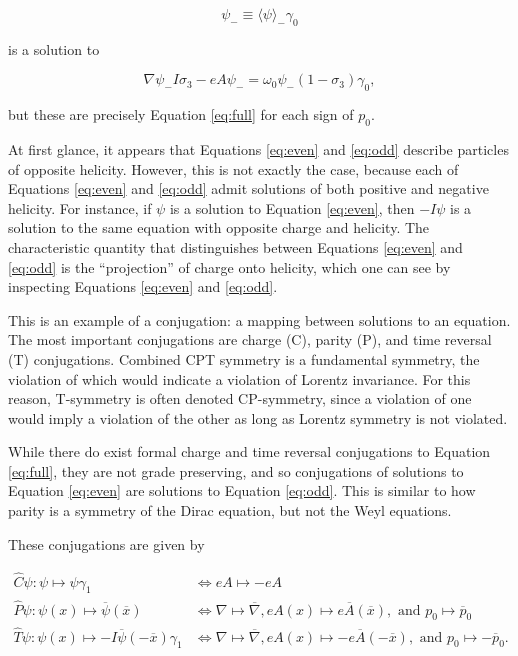 \documentclass{article}
\begin{document}
  \begin{equation}
    \psi_- \equiv \langle \psi \rangle_- \gamma_0\label{eq:0decomposition}
  \end{equation} 

  is a solution to

  \begin{equation}
    \nabla \psi_- I \sigma_3 - e A \psi_- = \omega_0 \psi_- (1 - \sigma_3) \gamma_0,\label{eq:odd}
  \end{equation}

  but these are precisely Equation \ref{eq:full} for each sign of $p_0$.

  At first glance, it appears that Equations \ref{eq:even} and \ref{eq:odd} describe particles of opposite helicity. However, this is not exactly the case, because each of Equations \ref{eq:even} and \ref{eq:odd} admit solutions of both positive and negative helicity. For instance, if $\psi$ is a solution to Equation \ref{eq:even}, then $-I \psi$ is a solution to the same equation with opposite charge and helicity. The characteristic quantity that distinguishes between Equations \ref{eq:even} and \ref{eq:odd} is the ``projection'' of charge onto helicity, which one can see by inspecting Equations \ref{eq:even} and \ref{eq:odd}.

  This is an example of a conjugation: a mapping between solutions to an equation. The most important conjugations are charge (C), parity (P), and time reversal (T) conjugations. Combined CPT symmetry is a fundamental symmetry, the violation of which would indicate a violation of Lorentz invariance. For this reason, T-symmetry is often denoted CP-symmetry, since a violation of one would imply a violation of the other as long as Lorentz symmetry is not violated.

  While there do exist formal charge and time reversal conjugations to Equation \ref{eq:full}, they are not grade preserving, and so conjugations of solutions to Equation \ref{eq:even} are solutions to Equation \ref{eq:odd}. This is similar to how parity is a symmetry of the Dirac equation, but not the Weyl equations.

  These conjugations are given by

  \begin{align}
    \hat C \psi : \psi \mapsto \psi \gamma_1 &\iff eA \mapsto - eA \label{eq:charge}\\
    \hat P \psi : \psi(x) \mapsto \overline \psi(\overline x) &\iff \nabla \mapsto \overline \nabla, eA(x) \mapsto e\overline A(\overline x), \text{ and } p_0 \mapsto \overline p_0 \label{eq:parity}\\
    \hat T \psi : \psi(x) \mapsto -I \overline \psi(-\overline x) \gamma_1 &\iff \nabla \mapsto \overline\nabla, eA(x) \mapsto -e\overline A(-\overline x), \text{ and } p_0 \mapsto - \overline p_0.\label{eq:time}
  \end{align}
\end{document}
